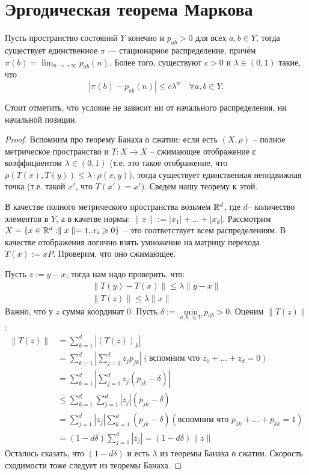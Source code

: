 \section{Эргодическая теорема Маркова}

\begin{theorem}[Маркова]
    Пусть пространство состояний $Y$ конечно и $p_{ab} > 0$ для всех $a, b\in Y$, тогда существует единственное $\pi$ --- стационарное распределение, причём
    $\pi(b) = \lim_{n\to+\infty}p_{ab}(n)$. Более того,
    существуют $c > 0$ и $\lambda \in (0, 1)$ такие,
    что 
    $$|\pi(b) - p_{ab}(n)|\le c\lambda^n\quad \forall a, b\in Y.$$ 
\end{theorem}

Стоит отметить, что условие не зависит ни от начального распределения, ни начальной позиции. 

\begin{proof}
   Вспомним про теорему Банаха о сжатии: если есть $(X, \rho)$ -- полное метрическое пространство и $T:X \to X$ -- сжимающее отображение с коэффициентом $\lambda \in (0, 1)$ (т.е. это такое отображение, что $\rho(T(x), T(y)) \le \lambda \cdot \rho(x, y)$), тогда существует единственная неподвижная точка (т.е. такой $x'$, что $T(x')=x'$). Сведем нашу теорему к этой.
   
   В качестве полного метрического пространства возьмем $\mathbb{R}^d$, где $d$-- количество элементов в $Y$, а в качетве нормы: $\parallel x \parallel  := |x_1| + \dots + |x_d|$. Рассмотрим $X = \{ x \in \mathbb{R}^d : \parallel x \parallel = 1, x_i \geqslant 0 \}$ -- это соответствует всем распределениям. В качестве отображения логично взять умножение на матрицу перехода $T(x) := xP$. Проверим, что оно сжимающее.
   
   Пусть $z := y - x$, тогда нам надо проверить, что: \begin{gather*}
       \parallel T(y) - T(x) \parallel \le \lambda \parallel y - x \parallel \\
       \parallel T(z) \parallel \le \lambda \parallel x \parallel
   \end{gather*}
   Важно, что у $z$ сумма координат 0.
   Пусть $\delta := \min\limits_{a, b, \in Y} p_{ab} > 0$.
   Оценим $\parallel T(z) \parallel$: \begin{align*}
        \parallel T(z) \parallel &= \sum_{k=1}^d |(T(z))_k| \\
        &= \sum_{k=1}^d |\sum_{j=1}^d z_jp_{jk}| (\text{вспомним что } z_1 + \dots + z_d = 0) \\
        &= \sum_{k=1}^d |\sum_{j=1}^d z_j(p_{jk} - \delta)|  \\
        &\le \sum_{k=1}^d \sum_{j=1}^d 
        |z_j|(p_{jk} - \delta) \\
        &= \sum_{j=1}^d |z_j| \sum_{k=1}^d 
        (p_{jk} - \delta) (\text{вспомним что } p_{1k} + \dots + p_{kk} = 1) \\
        &= (1-d\delta)\sum_{j=1}^d |z_j| = (1-d\delta)\parallel z \parallel
   \end{align*}
   Осталось сказать, что $(1-d\delta)$ и есть $\lambda$ из теоремы Банаха о сжатии. Скорость сходимости тоже следует из теоремы Банаха.
\end{proof}

